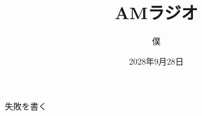\documentclass[11pt,dvipdfmx]{jarticle}
\begin{document}
\title{AMラジオ}
\author{僕}
\date{2028年9月28日}
\maketitle






\renewcommand{\refname}{参考文献}



失敗を書く
\end{document}
